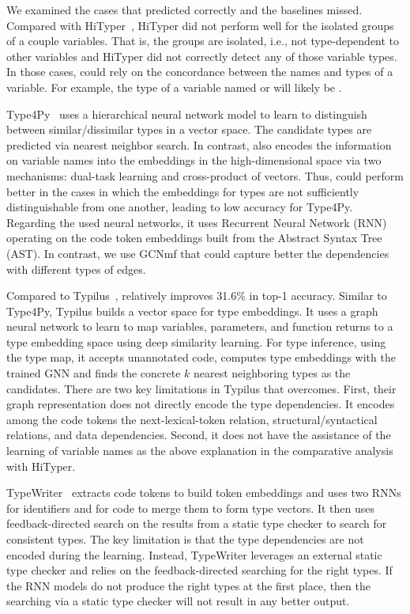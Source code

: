
We examined the cases that {\tool} predicted correctly and the
baselines missed. Compared with HiTyper~\cite{HiTyper-icse22}, HiTyper
did not perform well for the isolated groups of a couple
variables. That is, the groups are isolated, i.e., not type-dependent
to other variables and HiTyper did not correctly detect any of those
variable types. In those cases, {\tool} could rely on the concordance
between the names and types of a variable. For example, the type of a
variable named  or  will likely be .

Type4Py~\cite{Type4Py-icse22} uses a hierarchical neural network model
to learn to distinguish between similar/dissimilar types in a vector
space. The candidate types are predicted via nearest neighbor search.
In contrast, {\tool} also encodes the information on variable names
into the embeddings in the high-dimensional space via two mechanisms:
dual-task learning and cross-product of vectors. Thus, {\tool} could
perform better in the cases in which the embeddings for types are not
sufficiently distinguishable from one another, leading to low accuracy
for Type4Py. Regarding the used neural networks, it uses Recurrent
Neural Network (RNN) operating on the code token embeddings built from
the Abstract Syntax Tree (AST). In contrast, we use GCNmf that could
capture better the dependencies with different types of edges.

Compared to Typilus~\cite{typilus-pldi20}, {\tool} relatively improves
31.6\% in top-1 accuracy. Similar to Type4Py, Typilus builds a vector
space for type embeddings. It uses a graph neural network to learn to
map variables, parameters, and function returns to a type embedding
space using deep similarity learning. For type inference, using the
type map, it accepts unannotated code, computes type embeddings with
the trained GNN and finds the concrete $k$ nearest neighboring types
as the candidates. There are two key limitations in Typilus that
{\tool} overcomes. First, their graph representation does not directly
encode the type dependencies. It encodes among the code tokens the
next-lexical-token relation, structural/syntactical relations, and
data dependencies. Second, it does not have the assistance of the
learning of variable names as the above explanation in the comparative
analysis with HiTyper.

TypeWriter~\cite{typewriter-fse20} extracts code tokens to build token
embeddings and uses two RNNs for identifiers and for code to merge
them to form type vectors. It then uses feedback-directed search on
the results from a static type checker to search for consistent types.
The key limitation is that the type dependencies are not encoded
during the learning. Instead, TypeWriter leverages an external static
type checker and relies on the feedback-directed searching for the
right types. If the RNN models do not produce the right types at the
first place, then the searching via a static type checker will not
result in any better output.

